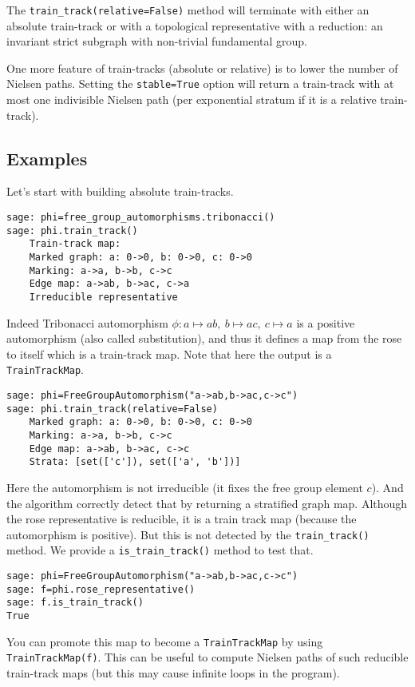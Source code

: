 \documentclass[10pt,a4paper]{article}
\begin{document}
The \texttt{train\_track(relative=False)} method will terminate with
either an absolute train-track or with a topological representative
with a reduction: an invariant strict subgraph with non-trivial
fundamental group.

One more feature of train-tracks (absolute or relative) is to lower
the number of Nielsen paths. Setting the \texttt{stable=True}
option will return a train-track with at most one indivisible Nielsen path (per exponential stratum if it is a relative
train-track).

\subsection{Examples}

Let's start with building absolute train-tracks.

\begin{verbatim}
sage: phi=free_group_automorphisms.tribonacci()
sage: phi.train_track()
    Train-track map:
    Marked graph: a: 0->0, b: 0->0, c: 0->0
    Marking: a->a, b->b, c->c
    Edge map: a->ab, b->ac, c->a
    Irreducible representative
\end{verbatim}
Indeed Tribonacci automorphism
$\phi:a\mapsto ab,\ b\mapsto ac,\ c\mapsto a$
is a positive automorphism (also called
substitution), and thus it defines a map from the
rose to itself which is a train-track map. Note that here the output
is a \texttt{TrainTrackMap}.

\begin{verbatim}
sage: phi=FreeGroupAutomorphism("a->ab,b->ac,c->c")
sage: phi.train_track(relative=False)
    Marked graph: a: 0->0, b: 0->0, c: 0->0
    Marking: a->a, b->b, c->c
    Edge map: a->ab, b->ac, c->c
    Strata: [set(['c']), set(['a', 'b'])]
\end{verbatim}
Here the automorphism is not irreducible (it fixes the free group
element $c$).
And the algorithm correctly detect that by returning a stratified
graph map. Although the rose representative is reducible, it is a
train track map (because the automorphism is positive). But this is
not detected by the \texttt{train\_track()} method. We provide a
\texttt{is\_train\_track()} method to test that.
\begin{verbatim}
sage: phi=FreeGroupAutomorphism("a->ab,b->ac,c->c")
sage: f=phi.rose_representative()
sage: f.is_train_track()
True
\end{verbatim}
You can promote this map to become a \texttt{TrainTrackMap} by using
\texttt{TrainTrackMap(f)}. This can be useful to compute Nielsen paths
of such reducible train-track maps (but this may cause infinite loops
in the program).
\end{document}
